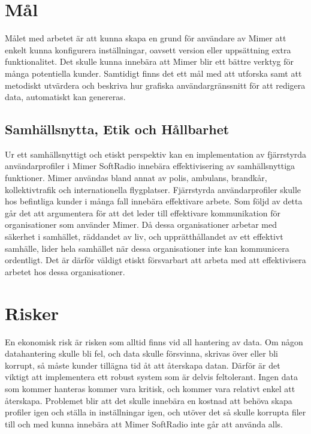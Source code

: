\section{Mål}
\label{sec:intro:mål}
Målet med arbetet är att kunna skapa en grund för användare av Mimer att enkelt kunna konfigurera inställningar, oavsett version eller uppsättning extra funktionalitet. Det skulle kunna innebära att Mimer blir ett bättre verktyg för många potentiella kunder. Samtidigt finns det ett mål med att utforska samt att metodiskt utvärdera och beskriva hur grafiska användargränssnitt för att redigera data, automatiskt kan genereras.

\subsection{Samhällsnytta, Etik och Hållbarhet}

Ur ett samhällsnyttigt och etiskt perspektiv kan en implementation av fjärrstyrda användarprofiler i Mimer SoftRadio innebära effektivisering av samhällsnyttiga funktioner. Mimer användas bland annat av polis, ambulans, brandkår, kollektivtrafik och internationella flygplatser. Fjärrstyrda användarprofiler skulle hos befintliga kunder i många fall innebära effektivare arbete. Som följd av detta går det att argumentera för att det leder till effektivare kommunikation för organisationer som använder Mimer. Då dessa organisationer arbetar med säkerhet i samhället, räddandet av liv, och upprätthållandet av ett effektivt samhälle, lider hela samhället när dessa organisationer inte kan kommunicera ordentligt. Det är därför väldigt etiskt försvarbart att arbeta med att effektivisera arbetet hos dessa organisationer.

\section{Risker}
\label{sec:intro:risker}
En ekonomisk risk är risken som alltid finns vid all hantering av data. Om någon datahantering skulle bli fel, och data skulle försvinna, skrivas över eller bli korrupt, så måste kunder tillägna tid åt att återskapa datan. Därför är det viktigt att implementera ett robust system som är delvis feltolerant. Ingen data som kommer hanteras kommer vara kritisk, och kommer vara relativt enkel att återskapa. Problemet blir att det skulle innebära en kostnad att behöva skapa profiler igen och ställa in inställningar igen, och utöver det så skulle korrupta filer till och med kunna innebära att Mimer SoftRadio inte går att använda alls.

